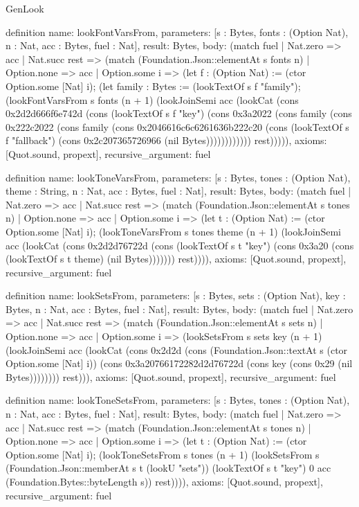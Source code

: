 \begin{lexlean}{GenLook}
\begin{semanticmodule}
definition{
  name: lookFontVarsFrom,
  parameters: [s : Bytes, fonts : (Option Nat), n : Nat, acc : Bytes, fuel : Nat],
  result: Bytes,
  body: (match fuel
    | Nat.zero => acc
    | Nat.succ rest => (match (Foundation.Json::elementAt s fonts n)
      | Option.none => acc
      | Option.some i => (let f : (Option Nat) := (ctor Option.some [Nat] i); (let family : Bytes := (lookTextOf s f "family"); (lookFontVarsFrom s fonts (n + 1) (lookJoinSemi acc (lookCat (cons 0x2d2d666f6e742d (cons (lookTextOf s f "key") (cons 0x3a2022 (cons family (cons 0x222c2022 (cons family (cons 0x2046616c6c6261636b222c20 (cons (lookTextOf s f "fallback") (cons 0x2c207365726966 (nil Bytes)))))))))))) rest))))),
  axioms: [Quot.sound, propext],
  recursive_argument: fuel
}

definition{
  name: lookToneVarsFrom,
  parameters: [s : Bytes, tones : (Option Nat), theme : String, n : Nat, acc : Bytes, fuel : Nat],
  result: Bytes,
  body: (match fuel
    | Nat.zero => acc
    | Nat.succ rest => (match (Foundation.Json::elementAt s tones n)
      | Option.none => acc
      | Option.some i => (let t : (Option Nat) := (ctor Option.some [Nat] i); (lookToneVarsFrom s tones theme (n + 1) (lookJoinSemi acc (lookCat (cons 0x2d2d76722d (cons (lookTextOf s t "key") (cons 0x3a20 (cons (lookTextOf s t theme) (nil Bytes))))))) rest)))),
  axioms: [Quot.sound, propext],
  recursive_argument: fuel
}

definition{
  name: lookSetsFrom,
  parameters: [s : Bytes, sets : (Option Nat), key : Bytes, n : Nat, acc : Bytes, fuel : Nat],
  result: Bytes,
  body: (match fuel
    | Nat.zero => acc
    | Nat.succ rest => (match (Foundation.Json::elementAt s sets n)
      | Option.none => acc
      | Option.some i => (lookSetsFrom s sets key (n + 1) (lookJoinSemi acc (lookCat (cons 0x2d2d (cons (Foundation.Json::textAt s (ctor Option.some [Nat] i)) (cons 0x3a20766172282d2d76722d (cons key (cons 0x29 (nil Bytes)))))))) rest))),
  axioms: [Quot.sound, propext],
  recursive_argument: fuel
}

definition{
  name: lookToneSetsFrom,
  parameters: [s : Bytes, tones : (Option Nat), n : Nat, acc : Bytes, fuel : Nat],
  result: Bytes,
  body: (match fuel
    | Nat.zero => acc
    | Nat.succ rest => (match (Foundation.Json::elementAt s tones n)
      | Option.none => acc
      | Option.some i => (let t : (Option Nat) := (ctor Option.some [Nat] i); (lookToneSetsFrom s tones (n + 1) (lookSetsFrom s (Foundation.Json::memberAt s t (lookU "sets")) (lookTextOf s t "key") 0 acc (Foundation.Bytes::byteLength s)) rest)))),
  axioms: [Quot.sound, propext],
  recursive_argument: fuel
}


\end{semanticmodule}
\end{lexlean}
